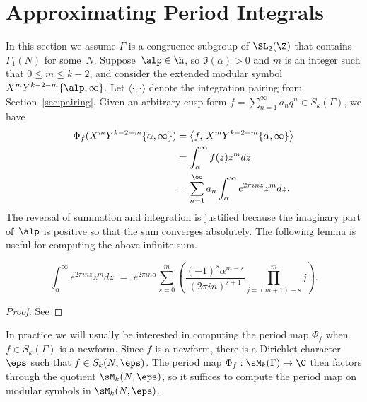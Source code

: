 \section{Approximating Period Integrals}
\label{sec:numper}
In this section we assume $\Gamma$ is a congruence subgroup
of $\SL_2(\Z)$ that contains $\Gamma_1(N)$ for some~$N$.
Suppose~$\alp\in \h$, so $\Im(\alpha)>0$ and $m$ is
an integer such that $0\leq m\leq k-2$,
and consider the extended modular symbol
$X^mY^{k-2-m}\{\alp,\infty\}$.
Let $\langle \cdot, \cdot \rangle$ denote 
the integration pairing from Section~\ref{sec:pairing}.
Given an arbitrary cusp form $f =\sum_{n=1}^{\infty} a_n q^n\in S_k(\Gamma)$,
we have
\begin{align}
\Phi_f(X^mY^{k-2-m}\{\alpha,\infty\}) &=
\left\langle f, \, X^mY^{k-2-m}\{\alpha,\infty\}\right\rangle \\
&= \int_{\alpha}^{\infty} f(z)z^m dz \\
&=  \sum_{n=1}^{\oo} a_n \int_{\alpha}^{\infty} e^{2\pi i n z} z^m dz.
\label{eqn:intsum}
\end{align}
The reversal of summation and integration is justified because
the imaginary part of~$\alp$ is positive so that the sum
converges absolutely.  The following
lemma is useful for computing the above infinite sum.
\begin{lemma}\label{lem:intexp}
\begin{equation}\label{intexp}
\int_{\alpha}^{\infty} e^{2\pi i n z} z^m dz
   \,\,=\,\, e^{2\pi i n \alpha} 
      \sum_{s=0}^m \left(
          \frac{(-1)^s \alpha^{m-s}}
              {(2\pi i n)^{s+1}}
         \prod_{j=(m+1)-s}^m j\right).
\end{equation}
\end{lemma}
\begin{proof}
See 
\end{proof}


In practice we will usually be interested in computing the period map
$\Phi_f$ when $f \in S_k(\Gamma)$ is a newform.  Since $f$ is a
newform, there is a Dirichlet character $\eps$ such that $f \in
S_k(N,\eps)$.  The period map $\Phi_f : \sM_k(\Gamma) \to \C$ then
factors through the quotient $\sM_k(N,\eps)$, so it suffices to
compute the period map on modular symbols in $\sM_k(N,\eps)$.

